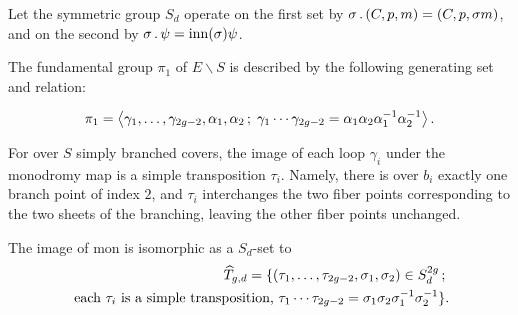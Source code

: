 Let the symmetric group $S_d$ operate on the first set by $\sigma \,.\, (C,p,m)=(C,p,\sigma m)$, and on the second by $\sigma \,.\, \psi = \operatorname{inn}(\sigma) \psi$.

The fundamental group $\pi_1$ of $E\smallsetminus S$ is described by the following generating set and relation:

\[\pi_1=\left\langle \gamma_1,\dotsc,\gamma_{2g-2},\alpha_1,\alpha_2\,;\; \gamma_1\dotsm\gamma_{2g-2}=\alpha_1\alpha_2\alpha_1^{-1}\alpha_2^{-1} \right\rangle.\]

For over $S$ simply branched covers, the image of each loop $\gamma_i$ under the monodromy map is a simple transposition $\tau_i$. Namely, there is over $b_i$ exactly one branch point of index $2$, and $\tau_i$ interchanges the two fiber points corresponding to the two sheets of the branching, leaving the other fiber points unchanged.

\begin{prop}
 The image of $\text{mon}$ is isomorphic as a $S_d$-set to \begin{align*}\widehat{T}_{g,d} = \{(\tau_1,\dotsc,\tau_{2g-2},\sigma_1,\sigma_2)\in S_d^{2g}\,;\;\\ \text{ each }\tau_i\text{ is a simple transposition, }\tau_1\dotsm\tau_{2g-2}=\sigma_1\sigma_2\sigma_1^{-1}\sigma_2^{-1}\}.\end{align*}
\end{prop}
